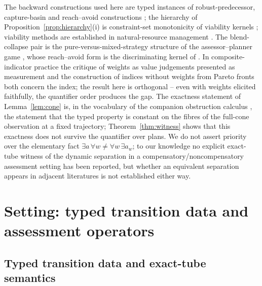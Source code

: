 \documentclass[preprint,11pt,authoryear]{elsarticle}
\theoremstyle{definition}
\theoremstyle{remark}
\begin{document}
The backward constructions used here are typed instances of robust-predecessor, capture-basin and reach--avoid constructions \citep{Aubin1991,Aubin2011,SaintPierre1994,Lygeros1999,AubinCatte2002}; the hierarchy of Proposition~\ref{prop:hierarchy}(i) is constraint-set monotonicity of viability kernels \citep{Aubin1991,Frankowska1989}; viability methods are established in natural-resource management \citep{DeLaraDoyen2008,Doyen2012}. The blend-collapse pair is the pure-versus-mixed-strategy structure of the assessor--planner game \citep{vonNeumann1928,Sion1958}, whose reach--avoid form is the discriminating kernel of \citet{Cardaliaguet1996} \citep[numerically,][]{Cardaliaguet1999}. In composite-indicator practice the critique of weights as value judgements presented as measurement \citep{Hickel2020,Fischer2022} and the construction of indices without weights from Pareto fronts \citep{Gao2023} both concern the index; the result here is orthogonal -- even with weights elicited faithfully, the quantifier order produces the gap. The exactness statement of Lemma~\ref{lem:cone} is, in the vocabulary of the companion obstruction calculus \citep{Abaee2026obs}, the statement that the typed property is constant on the fibres of the full-cone observation at a fixed trajectory; Theorem~\ref{thm:witness} shows that this exactness does not survive the quantifier over plans. We do not assert priority over the elementary fact $\exists a\,\forall w\ne\forall w\,\exists a_w$; to our knowledge no explicit exact-tube witness of the dynamic separation in a compensatory/noncompensatory assessment setting has been reported, but whether an equivalent separation appears in adjacent literatures is not established either way.

\section{Setting: typed transition data and assessment operators}\label{sec:setting}

\subsection{Typed transition data and exact-tube semantics}
\end{document}
